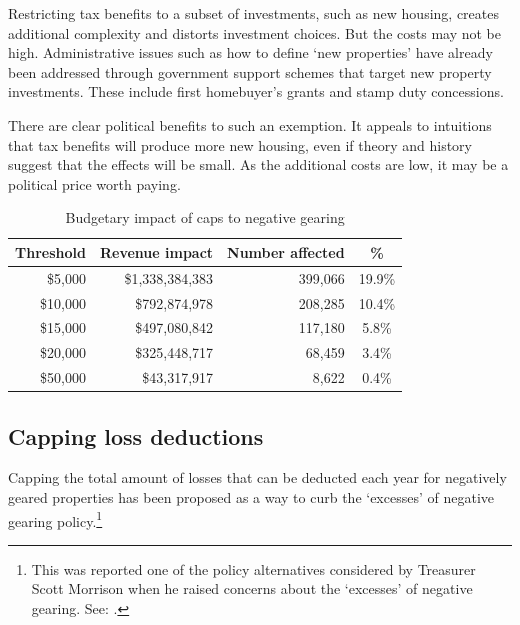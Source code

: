 Restricting tax benefits to a subset of investments, such as new housing, creates additional complexity and distorts investment choices. But the costs may not be high. Administrative issues such as how to define ‘new properties’ have already been addressed through government support schemes that target new property investments. These include first homebuyer’s grants and stamp duty concessions. 

There are clear political benefits to such an exemption.  It appeals to intuitions that tax benefits will produce more new housing, even if theory and history suggest that the effects will be small.  As the additional costs are low, it may be a political price worth paying.

\begin{table}
\caption{Budgetary impact of caps to negative gearing}\label{tbl:cap-NG}
\begin{tabularx}{\linewidth}{rRRS}
  \toprule
{\textbf{Threshold}} & {\textbf{Revenue impact}} & {\textbf{Number affected}} & {\textbf{\%}} \\ 
  \midrule
  \$5,000 & \$1,338,384,383 & 399,066 & 19.9\% \\ 
  \$10,000 & \$792,874,978 & 208,285 & 10.4\% \\ 
  \$15,000 & \$497,080,842 & 117,180 & 5.8\% \\ 
  \$20,000 & \$325,448,717 & 68,459 & 3.4\% \\ 
  \$50,000 & \$43,317,917 & 8,622 & 0.4\% \\ 
   \bottomrule
\end{tabularx}

\end{table}

\subsection{Capping loss deductions}
Capping the total amount of losses that can be deducted each year for negatively geared properties has been proposed as a way to curb the ‘excesses’ of negative gearing policy.\footnote{This was reported one of the policy alternatives considered by Treasurer Scott Morrison when he raised concerns about the ‘excesses’ of negative gearing. See: \textcite{Coorey2016}.}



